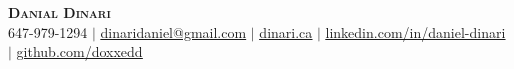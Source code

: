\begin{center}
    \textbf{\Huge \scshape Danial Dinari} \\ \vspace{1pt}
    \small 647-979-1294 $|$ 
    \href{mailto:dinaridaniel@gmail.com}{\underline{dinaridaniel@gmail.com}} $|$ 
    \href{https://dinari.ca/}{\underline{dinari.ca}} $|$
    \href{https://www.linkedin.com/in/daniel-dinari/}{\underline{linkedin.com/in/daniel-dinari}} $|$
    \href{https://github.com/doxxedd}{\underline{github.com/doxxedd}}
\end{center}